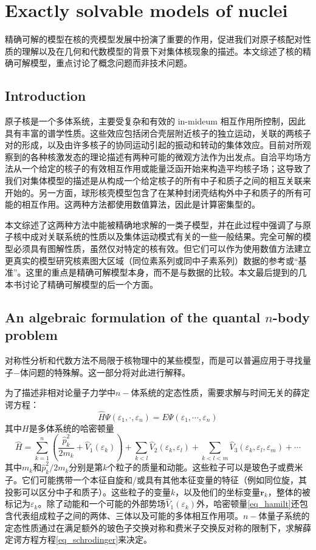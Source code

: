 \chapter{Exactly solvable models of nuclei}
精确可解的模型在核的壳模型发展中扮演了重要的作用，促进我们对原子核配对性质的理解以及在几何和代数模型的背景下对集体核现象的描述。本文综述了核的精确可解模型，重点讨论了概念问题而非技术问题。
\section{Introduction}
原子核是一个多体系统，主要受复杂和有效的 in-mideum 相互作用所控制，因此具有丰富的谱学性质。这些效应包括闭合壳层附近核子的独立运动，关联的两核子对的形成，以及由许多核子的协同运动引起的振动和转动的集体效应。目前对所观察到的各种核激发态的理论描述有两种可能的微观方法作为出发点。自洽平均场方法从一个给定的核子的有效相互作用或能量泛函开始来构造平均核子场；这导致了我们对集体模型的描述是从构成一个给定核子的所有中子和质子之间的相互关联来开始的。另一方面，球形核壳模型包含了在某种封闭壳结构外中子和质子的所有可能的相互作用。这两种方法都使用数值算法，因此是计算密集型的。

本文综述了这两种方法中能被精确地求解的一类子模型，并在此过程中强调了与原子核中成对关联系统的性质以及集体运动模式有关的一些一般结果。完全可解的模型必须具有图解性质，虽然仅对特定的核有效。但它们可以作为使用数值方法建立更真实的模型研究核素图大区域（同位素系列或同中子素系列）数据的参考或“基准”。这里的重点是精确可解模型本身，而不是与数据的比较。本文最后提到的几本书讨论了精确可解模型的后一个方面。

\section{An algebraic formulation of the quantal $n$-body problem}
对称性分析和代数方法不局限于核物理中的某些模型，而是可以普遍应用于寻找量子$-$体问题的特殊解。这一部分将对此进行解释。

为了描述非相对论量子力学中$n-$体系统的定态性质，需要求解与时间无关的薛定谔方程：
\begin{equation}\label{eq_schrodinger}
\widehat{H}\Psi(\varepsilon_1,\cdot,\varepsilon_n)=E\Psi(\varepsilon_1,\cdots,\varepsilon_n)
\end{equation}
其中$H$是多体系统的哈密顿量
\begin{equation}\label{eq_hamilt}
\widehat{H}=\sum_{k=1}^n\left(\frac{\widehat{p}^2_k}{2m_k}+\widehat{V}_1(\varepsilon_k)\right)+\sum_{k<l}\widehat{V}_2(\varepsilon_k,\varepsilon_l)+\sum_{k<l<m}\widehat{V}_3(\varepsilon_k,\varepsilon_l,\varepsilon_m)+\cdots
\end{equation}
其中$m_k$和$\widehat{p}_k^2/2m_k$分别是第$k$个粒子的质量和动能。这些粒子可以是玻色子或费米子。它们可能携带一个本征自旋和/或具有其他本征变量的特征（例如同位旋，其投影可以区分中子和质子）。这些粒子的变量$k$，以及他们的坐标变量$\bm{r}_k$，整体的被标记为$\varepsilon_k$。除了动能和一个可能的外部势场$\widehat{V}_1(\varepsilon_k)$外，哈密顿量\ref{eq_hamilt}还包含代表组成粒子之间的两体、三体以及可能的多体相互作用项。$n-$体量子系统的定态性质通过在满足额外的玻色子交换对称和费米子交换反对称的限制下，求解薛定谔方程方程\ref{eq_schrodinger}来决定。

